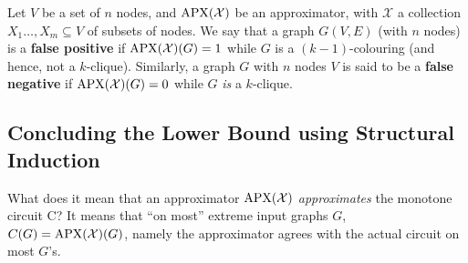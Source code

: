 
Let $V$ be a set of $n$ nodes, and  $\mathrm{APX}(\mathcal X)$ be an   approximator, with  $\mathcal X$ a collection $X_1\dots,X_m\subseteq V$ of subsets of nodes. We say that  a graph $G(V,E)$ (with $n$ nodes) is a \textbf{false positive} if $\mathrm{APX}(\mathcal X)(G)=1$ while $G$ is  a $(k-1)$-colouring (and hence, not a $k$-clique). Similarly, a graph $G$ with $n$ nodes $V$ is said to be a \textbf{false negative} if $\mathrm{APX}(\mathcal X)(G)=0$ while $G$ \emph{is} a $k$-clique.







%


\subsection{Concluding the Lower Bound using Structural Induction}\label{sec:Concluding-monotone-lower-bound-str-ind}



% 



What does it mean that an approximator $\mathrm{APX}(\mathcal X)$ \emph{approximates} the monotone circuit C? It means that ``on most'' extreme input graphs $G$, $C(G) = \mathrm{APX}(\mathcal X)(G)$, namely the approximator agrees with the actual circuit on most $G$'s. 

